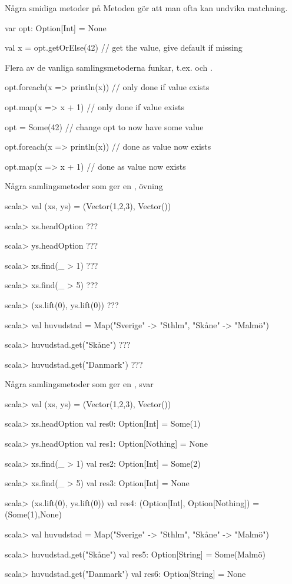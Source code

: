 \begin{Slide}{Några smidiga metoder på }\SlideFontSmall
Metoden  gör att man ofta kan undvika matchning.
\begin{Code}
var opt: Option[Int] = None

val x = opt.getOrElse(42)   // get the value, give default if missing
\end{Code}

Flera av de vanliga samlingsmetoderna funkar, t.ex.  och .
\begin{Code}
opt.foreach(x => println(x)) // only done if value exists

opt.map(x => x + 1)          // only done if value exists

opt = Some(42)               // change opt to now have some value

opt.foreach(x => println(x)) // done as value now exists

opt.map(x => x + 1)          // done as value now exists

\end{Code}
\end{Slide}


\begin{Slide}{Några samlingsmetoder som ger en , övning}
\begin{REPLsmall}
scala> val (xs, ys) = (Vector(1,2,3), Vector())

scala> xs.headOption
???

scala> ys.headOption
???

scala> xs.find(_ > 1)
???

scala> xs.find(_ > 5)
???

scala> (xs.lift(0), ys.lift(0))
???

scala> val huvudstad = Map("Sverige" -> "Sthlm", "Skåne" -> "Malmö")

scala> huvudstad.get("Skåne")
???

scala> huvudstad.get("Danmark")
???
\end{REPLsmall}
\end{Slide}

\begin{Slide}{Några samlingsmetoder som ger en , svar}
\begin{REPLsmall}
scala> val (xs, ys) = (Vector(1,2,3), Vector())

scala> xs.headOption
val res0: Option[Int] = Some(1)

scala> ys.headOption
val res1: Option[Nothing] = None

scala> xs.find(_ > 1)
val res2: Option[Int] = Some(2)

scala> xs.find(_ > 5)
val res3: Option[Int] = None

scala> (xs.lift(0), ys.lift(0))
val res4: (Option[Int], Option[Nothing]) = (Some(1),None)

scala> val huvudstad = Map("Sverige" -> "Sthlm", "Skåne" -> "Malmö")

scala> huvudstad.get("Skåne")
val res5: Option[String] = Some(Malmö)

scala> huvudstad.get("Danmark")
val res6: Option[String] = None
\end{REPLsmall}
\end{Slide}

